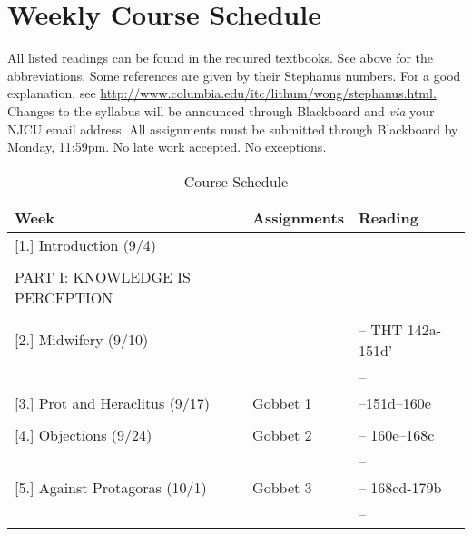 \documentclass[article,oneside]{memoir}
\begin{document}
\section{Weekly Course Schedule}
All listed readings can be found in the required textbooks. See above for the abbreviations. Some references are given by their Stephanus numbers. For a good explanation, see \href{http://www.columbia.edu/itc/lithum/wong/stephanus.html}{http://www.columbia.edu/itc/lithum/wong/stephanus.html.
} 
 Changes to the syllabus will be announced through Blackboard and \emph{via} your NJCU email address.  All assignments must be submitted through Blackboard by Monday, 11:59pm. No late work accepted. No exceptions.   \newline

\begin{center}
\begin{longtable}{p{4.5cm}p{2cm}p{6cm}}
 
  \caption{Course Schedule} \\
  \toprule
  \textbf{Week} &\textbf{Assignments} & \textbf{Reading} \\
  \midrule

  

[1.] Introduction	(9/4)	  			& 	 			&   \\
								&		  		&    \\ [1.8\baselineskip]
								
PART I: KNOWLEDGE IS PERCEPTION					& 				 & 	\\
								& 				 &   \\ [1.8\baselineskip]									

[2.] Midwifery (9/10)					& 				& -- THT 142a-151d' \\
			        					&			  	& -- \\  [1.8\baselineskip]
	
[3.] Prot and Heraclitus  (9/17)			& Gobbet 1		&  --151d--160e \\
			       					&		  		&   \\[1.8\baselineskip]


[4.] Objections  (9/24)				& Gobbet 2		& -- 160e--168c \\
			     				   	& 			    	& -- \\ [1.8\baselineskip]

[5.] Against Protagoras (10/1)			& Gobbet 3		 & -- 168cd-179b \\
								& 			    	&  --\\ [1.8\baselineskip]




\end{longtable}
\end{center}
\end{document}
